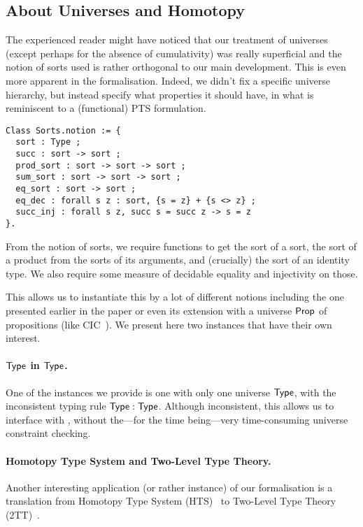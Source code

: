 \subsection{About Universes and Homotopy}
\label{sec:sorts}

The experienced reader might have noticed that our treatment of universes
(except perhaps for the absence of cumulativity) was really superficial and the
notion of sorts used is rather orthogonal to our main development.
This is even more apparent in the formalisation. Indeed, we didn't fix a
specific universe hierarchy, but instead specify what properties it should
have, in what is reminiscent to a (functional) PTS formulation.
%
\begin{verbatim}
Class Sorts.notion := {
  sort : Type ;
  succ : sort -> sort ;
  prod_sort : sort -> sort -> sort ;
  sum_sort : sort -> sort -> sort ;
  eq_sort : sort -> sort ;
  eq_dec : forall s z : sort, {s = z} + {s <> z} ;
  succ_inj : forall s z, succ s = succ z -> s = z
}.
\end{verbatim}
%
From the notion of sorts, we require functions to get the sort of a sort,
the sort of a product from the sorts of its arguments, and (crucially) the sort
of an identity type.
We also require some measure of decidable equality and injectivity on those.

This allows us to instantiate this by a lot of different notions including the
one presented earlier in the paper or even its extension with a universe $\mathsf{Prop}$
of propositions (like CIC~). We present here two
instances that have their own interest.

\paragraph{$\mathsf{Type}$ in $\mathsf{Type}$.}
One of the instances we provide is one with only one universe $\mathsf{Type}$, with the
inconsistent typing rule $\mathsf{Type} : \mathsf{Type}$.
Although inconsistent, this allows us to interface with \TemplateCoq, without
the---for the time being---very time-consuming universe constraint checking.

\paragraph{Homotopy Type System and Two-Level Type Theory.}
Another interesting application (or rather instance) of our formalisation
is a translation from Homotopy Type System (HTS)~ to
Two-Level Type Theory
(2TT)~.

